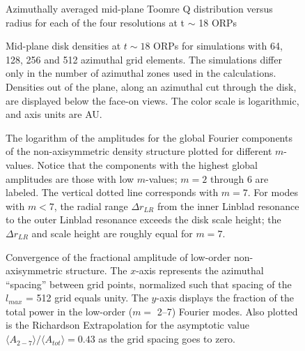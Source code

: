 \documentclass[manuscript]{aastex}
\begin{document}


\newpage

\begin{figure}
\caption{Azimuthally averaged mid-plane Toomre Q distribution versus radius for each of the four resolutions at t $\sim$ 18 ORPs}
\label{fig:Final_Q}
\end{figure}

\begin{figure}
\caption
{
Mid-plane disk densities at $t \sim 18$ ORPs for simulations with 64, 128, 256 and 512 azimuthal grid elements.
The simulations differ only in the number of  azimuthal zones used in the calculations.  Densities out of the plane, along an azimuthal cut through the disk, are displayed below the face-on views.  The color scale is logarithmic, and axis units are AU. 
}
\label{fig:DensityPlots}
\end{figure}
\newpage

\begin{figure}
\caption
{
The logarithm of the amplitudes for the global Fourier components of the non-axisymmetric density structure plotted for
different $m$-values. Notice that the components with the highest global amplitudes are those with low $m$-values; $m=2$
through 6 are labeled.  The vertical dotted line corresponds with $m=7$.  For modes with $m < 7$,  the radial range
$\Delta r_{LR}$ from  the inner Linblad resonance to the outer Linblad resonance exceeds the disk scale height; the
$\Delta r_{LR}$ and scale height are roughly equal for $m = 7$.
}
\label{fig:Am_vs_log_m}
\end{figure}

\begin{figure}
\caption
{
Convergence of the fractional amplitude of low-order non-axisymmetric structure.  The $x$-axis represents
the azimuthal ``spacing'' between grid points,  normalized such that spacing of the $l_{max}$ = 512 grid
equals unity.
The $y$-axis displays the fraction of the total power in the low-order ($m = $ 2--7) Fourier modes. 
Also plotted is the Richardson Extrapolation for the asymptotic value  
$\langle A_{2-7} \rangle / \langle A_{tot} \rangle = 0.43$ as the grid spacing goes to zero.  
}
\label{fig:Power_Extrap}
\end{figure}
\end{document}
